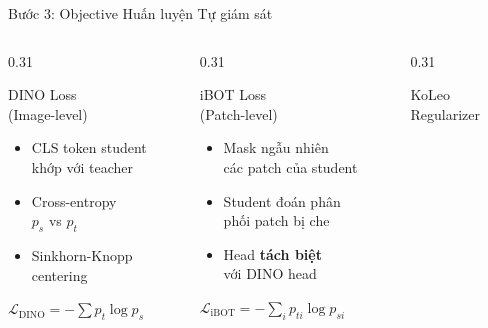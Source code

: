 \documentclass[aspectratio=169]{beamer}
\begin{document}
\begin{frame}[t,shrink=15]{Bước 3: Objective Huấn luyện Tự giám sát}
    \begin{columns}[t]
        \begin{column}{0.31\textwidth}
            \begin{block}{DINO Loss\\(Image-level)}
                \small
                \begin{itemize}
                    \item CLS token student\\khớp với teacher
                    \item Cross-entropy\\$p_s$ vs $p_t$
                    \item Sinkhorn-Knopp\\centering
                \end{itemize}
                \vspace{0.1cm}
                \centering$\mathcal{L}_\text{DINO} = -\sum p_t \log p_s$
            \end{block}
        \end{column}
        \begin{column}{0.31\textwidth}
            \begin{block}{iBOT Loss\\(Patch-level)}
                \small
                \begin{itemize}
                    \item Mask ngẫu nhiên\\các patch của student
                    \item Student đoán phân\\phối patch bị che
                    \item Head \textbf{tách biệt}\\với DINO head
                \end{itemize}
                \vspace{0.1cm}
                \centering$\mathcal{L}_\text{iBOT} = -\sum_i p_{ti}\!\log p_{si}$
            \end{block}
        \end{column}
        \begin{column}{0.31\textwidth}
            \begin{block}{KoLeo\\Regularizer}

\end{block}
\end{column}
\end{columns}
\end{frame}
\end{document}
